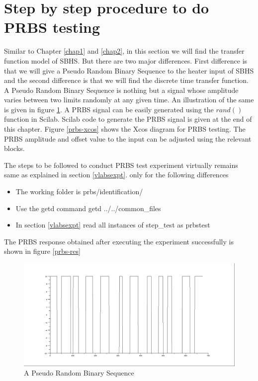 \section{Step by step procedure to do PRBS testing}

Similar to Chapter \ref{chap1} and \ref{chap2}, in this section we will find the transfer function model of SBHS. 
But there are two major differences. First difference is that we will give a Pseudo Random Binary Sequence to the 
heater input of SBHS and the second difference is that we will find the discrete time transfer function. A Pseudo Random 
Binary Sequence is nothing but a signal whose amplitude varies between two limits randomly at any given time. An 
illustration of the same is given in figure \ref{prbs-fig}. A PRBS signal can be easily generated using the $rand()$ 
function in Scilab. Scilab code to generate the PRBS signal is given at the end of this chapter. Figure \ref{prbs-xcos} 
shows the  Xcos diagram for PRBS testing. The PRBS amplitude and offset value to the input can be adjusted using the 
relevant blocks. 

The steps to be followed to conduct PRBS test experiment virtually remains same as explained in section \ref{vlabsexpt}. only for the following differences
\begin{itemize}
\item The working folder is prbs/identification/
\item Use the getd command getd ../../common\_files
\item In section \ref{vlabsexpt} read all instances of step\_test as prbstest
\end{itemize} The PRBS response obtained after executing the experiment successfully is shown in 
figure \ref{prbs-res}
\begin{figure}
\centering
\includegraphics[width=0.7\linewidth]{prbs/prbs-illustration.png}
\caption{A Pseudo Random Binary Sequence}
\label{prbs-fig}
\end{figure}

